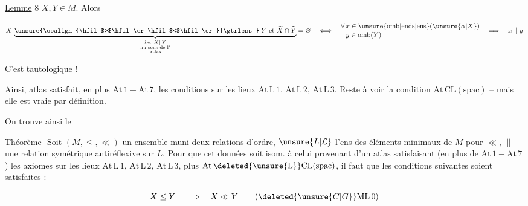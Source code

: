 
\uline{Lemme} 8  $X,Y\in M$. Alors

\[
X\,\underbrace{\mathrel{\unsure{\ooalign{\hfil$>$\hfil\cr\hfil$<$\hfil\cr}|\gtrless}}Y
  \text{ et }\widetilde X\cap\widetilde Y}
 _{\substack{\text{i.e. }X\parallel Y\\\text{au sens de l'}\\\text{atlas}}}=\varnothing
\quad\Longleftrightarrow\quad
\begin{aligned}
 &\forall\,x\in\unsure{\mathrm{omb}|\mathrm{ends}|\mathrm{ens}}(\unsure{\alpha|X})\\[-2pt]
 &\phantom{\forall\,}y\in\mathrm{omb}(Y)
\end{aligned}
\quad\Longrightarrow\quad x\parallel y
\]

C'est tautologique !

 Ainsi,  atlas satisfait, en plus  $\mathrm{At\,1}-\mathrm{At\,7}$, les conditions sur les lieux $\mathrm{At\,L\,1}$, $\mathrm{At\,L\,2}$, $\mathrm{At\,L\,3}$. Reste à voir la condition $\mathrm{At\,CL(spac)}$ -- mais elle est vraie par définition.

On trouve ainsi le

\uline{Théorème-} Soit $(M,{\leq},{\ll})$ un ensemble muni  deux relations d'ordre, $\unsure{L|\mathcal L}$ l'ens des éléments minimaux de $M$ pour $\ll$, $\parallel$ une relation symétrique antiréflexive sur $L$. Pour que cet  données  soit isom. à celui provenant d'un atlas  satisfaisant  (en plus de $\mathrm{At\,1}-\mathrm{At\,7}$) les axiomes sur les lieux $\mathrm{At\,L\,1}$, $\mathrm{At\,L\,2}$, $\mathrm{At\,L\,3}$, plus $\mathrm{At\,\deleted{\unsure{L}}CL(spac)}$, il faut  que les conditions suivantes soient satisfaites :

\begingroup\makeatletter\tagsleft@true\makeatother
\[
 X\leq Y\quad\Longrightarrow\quad X\ll Y
 \tag*{$(\deleted{\unsure{C|G}}\mathrm{ML\,0})$}
\]

